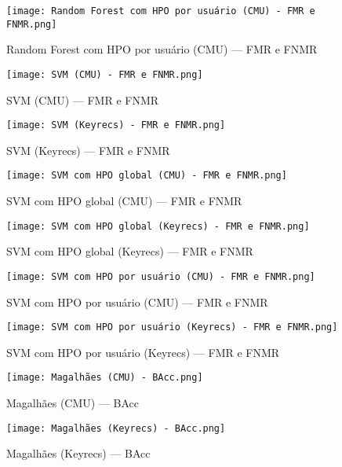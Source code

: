 \begin{figure}[H]
    \caption{Random Forest com HPO por usuário (CMU) --- FMR e FNMR}\label{fig:Random Forest com HPO por usuário (CMU) --- FMR e FNMR}
    \centering
    \texttt{[image: Random Forest com HPO por usuário (CMU) - FMR e FNMR.png]}
\end{figure}
\begin{figure}[H]
    \caption{SVM (CMU) --- FMR e FNMR}\label{fig:SVM (CMU) --- FMR e FNMR}
    \centering
    \texttt{[image: SVM (CMU) - FMR e FNMR.png]}
\end{figure}
\begin{figure}[H]
    \caption{SVM (Keyrecs) --- FMR e FNMR}\label{fig:SVM (Keyrecs) --- FMR e FNMR}
    \centering
    \texttt{[image: SVM (Keyrecs) - FMR e FNMR.png]}
\end{figure}
\begin{figure}[H]
    \caption{SVM com HPO global (CMU) --- FMR e FNMR}\label{fig:SVM com HPO global (CMU) --- FMR e FNMR}
    \centering
    \texttt{[image: SVM com HPO global (CMU) - FMR e FNMR.png]}
\end{figure}
\begin{figure}[H]
    \caption{SVM com HPO global (Keyrecs) --- FMR e FNMR}\label{fig:SVM com HPO global (Keyrecs) --- FMR e FNMR}
    \centering
    \texttt{[image: SVM com HPO global (Keyrecs) - FMR e FNMR.png]}
\end{figure}
\begin{figure}[H]
    \caption{SVM com HPO por usuário (CMU) --- FMR e FNMR}\label{fig:SVM com HPO por usuário (CMU) --- FMR e FNMR}
    \centering
    \texttt{[image: SVM com HPO por usuário (CMU) - FMR e FNMR.png]}
\end{figure}
\begin{figure}[H]
    \caption{SVM com HPO por usuário (Keyrecs) --- FMR e FNMR}\label{fig:SVM com HPO por usuário (Keyrecs) --- FMR e FNMR}
    \centering
    \texttt{[image: SVM com HPO por usuário (Keyrecs) - FMR e FNMR.png]}
\end{figure}
\begin{figure}[H]
    \caption{Magalhães (CMU) --- BAcc}\label{fig:Magalhães (CMU) - BAcc}
    \centering
    \texttt{[image: Magalhães (CMU) - BAcc.png]}
\end{figure}
\begin{figure}[H]
    \caption{Magalhães (Keyrecs) --- BAcc}\label{fig:Magalhães (Keyrecs) - BAcc}
    \centering
    \texttt{[image: Magalhães (Keyrecs) - BAcc.png]}
\end{figure}

